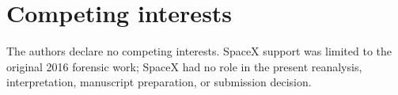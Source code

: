 \documentclass[]{seismica}
\begin{document}
\section*{Competing interests}

The authors declare no competing interests. SpaceX support was limited to the
original 2016 forensic work; SpaceX had no role in the present reanalysis,
interpretation, manuscript preparation, or submission decision.


\end{document}
